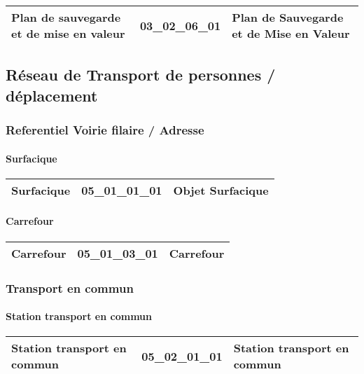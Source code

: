 \documentclass[12pt,titlepage,oneside]{book}
\begin{document}
\renewcommand{\arraystretch}{1.2}
\begin{supertabular}{|p{10cm}|c|p{15cm}|}
 Plan de sauvegarde et de mise en valeur & 03\_02\_06\_01 & Plan de Sauvegarde et de Mise en Valeur\\
\hline
\end{supertabular}
\subsection{Réseau de Transport de personnes / déplacement}
\subsubsection{\large Referentiel Voirie filaire / Adresse}
\paragraph{Surfacique}
\noindent
\vspace{\baselineskip}

\renewcommand{\arraystretch}{1.2}
\begin{supertabular}{|p{10cm}|c|p{15cm}|}
 Surfacique & 05\_01\_01\_01 & Objet Surfacique\\
\hline
\end{supertabular}


\paragraph{Carrefour}
\noindent
\vspace{\baselineskip}

\renewcommand{\arraystretch}{1.2}
\begin{supertabular}{|p{10cm}|c|p{15cm}|}
 Carrefour & 05\_01\_03\_01 & Carrefour\\
\hline
\end{supertabular}

\subsubsection{\large Transport en commun}
\paragraph{Station transport en commun}
\noindent
\vspace{\baselineskip}

\renewcommand{\arraystretch}{1.2}
\begin{supertabular}{|p{10cm}|c|p{15cm}|}
 Station transport en commun & 05\_02\_01\_01 & Station transport en commun\\
\hline
\end{supertabular}
\end{document}
